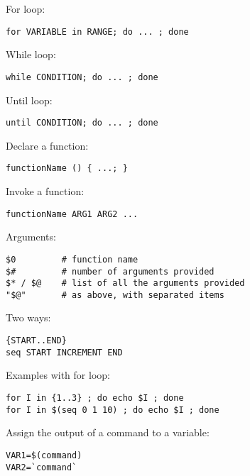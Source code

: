 \documentclass[twocolumn,8pt]{article}
\begin{document}
\begin{mdframed}[frametitle=Loops]
For loop:
\begin{lstlisting}
for VARIABLE in RANGE; do ... ; done
\end{lstlisting}

While loop:
\begin{lstlisting}
while CONDITION; do ... ; done
\end{lstlisting}
Until loop:
\begin{lstlisting}
until CONDITION; do ... ; done
\end{lstlisting}

\end{mdframed}


\begin{mdframed}[frametitle=Functions]
Declare a function:
\begin{lstlisting}
functionName () { ...; }
\end{lstlisting}

Invoke a function:
\begin{lstlisting}
functionName ARG1 ARG2 ...
\end{lstlisting}

Arguments:
\begin{lstlisting}
$0         # function name
$#         # number of arguments provided
$* / $@    # list of all the arguments provided
"$@"       # as above, with separated items
\end{lstlisting}
\end{mdframed}



\begin{mdframed}[frametitle=Ranges]
Two ways:
\begin{lstlisting}
{START..END}
seq START INCREMENT END
\end{lstlisting}

Examples with for loop:
\begin{lstlisting}
for I in {1..3} ; do echo $I ; done
for I in $(seq 0 1 10) ; do echo $I ; done
\end{lstlisting}
\end{mdframed}



\begin{mdframed}[frametitle=Subshell]
Assign the output of a command to a variable:
\begin{lstlisting}
VAR1=$(command)
VAR2=`command`
\end{lstlisting}
\end{mdframed}



\end{document}
